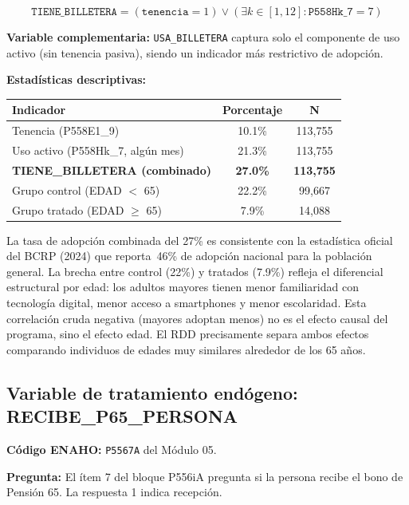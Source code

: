 \documentclass[12pt, a4paper]{article}
\begin{document}
$$\texttt{TIENE\_BILLETERA} = (\texttt{tenencia} = 1) \vee (\exists k \in [1,12] : \texttt{P558Hk\_7} = 7)$$

\textbf{Variable complementaria:} \texttt{USA\_BILLETERA} captura solo el
componente de uso activo (sin tenencia pasiva), siendo un indicador más
restrictivo de adopción.

\textbf{Estadísticas descriptivas:}

\begin{center}
\begin{tabular}{lcc}
\toprule
Indicador & Porcentaje & N \\\midrule
Tenencia (P558E1\_9) & 10.1\% & 113{,}755 \\
Uso activo (P558Hk\_7, algún mes) & 21.3\% & 113{,}755 \\
\textbf{TIENE\_BILLETERA (combinado)} & \textbf{27.0\%} & \textbf{113{,}755} \\
\midrule
Grupo control (EDAD $<$ 65) & 22.2\% & 99{,}667 \\
Grupo tratado (EDAD $\geq$ 65) & 7.9\% & 14{,}088 \\
\bottomrule
\end{tabular}
\end{center}

\begin{interpcaja}
La tasa de adopción combinada del 27\% es consistente con la estadística
oficial del BCRP (2024) que reporta~46\% de adopción nacional para la
población general. La brecha entre control (22\%) y tratados (7.9\%) refleja
el diferencial estructural por edad: los adultos mayores tienen menor
familiaridad con tecnología digital, menor acceso a smartphones y menor
escolaridad. Esta correlación cruda negativa (mayores adoptan menos) no es
el efecto causal del programa, sino el efecto edad. El RDD precisamente
separa ambos efectos comparando individuos de edades muy similares alrededor
de los 65 años.
\end{interpcaja}

\subsection{Variable de tratamiento endógeno: RECIBE\_P65\_PERSONA}

\textbf{Código ENAHO:} \texttt{P5567A} del Módulo 05.

\textbf{Pregunta:} El ítem 7 del bloque P556iA pregunta si la persona recibe
el bono de Pensión 65. La respuesta 1 indica recepción.
\end{document}
